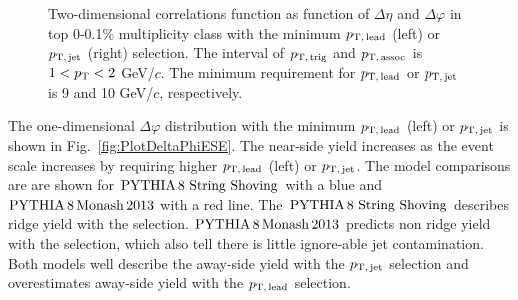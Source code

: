 \begin{figure}[h!]
	\centering
	\caption{ Two-dimensional correlations function as function of $\Delta\eta$ and $\Delta\varphi$ in top 0-0.1\% multiplicity class with the minimum $p_\mathrm{T,\,lead}$ (left) or $p_\mathrm{T,\,jet}$ (right) selection. The interval of $p_\mathrm{T,\,trig}$ and $p_\mathrm{T,\,assoc}$ is $1<p_\mathrm{T}<2$ GeV/$c$. The minimum requirement for $p_\mathrm{T,\,lead}$ or $p_\mathrm{T,\,jet}$ is 9 and 10 GeV/$c$, respectively. }
	\label{fig:PlotCorrHMTSel}
\end{figure}

The one-dimensional $\Delta\varphi$ distribution with the minimum $p_\mathrm{T,\,lead}$ (left) or $p_\mathrm{T,\,jet}$ is shown in Fig.~\ref{fig:PlotDeltaPhiESE}. The near-side yield increases as the event scale increases by requiring higher $p_\mathrm{T,\,lead}$ (left) or $p_\mathrm{T,\,jet}$. The model comparisons are are shown for $\mathrm{PYTHIA}\,8~\mathrm{String}~\mathrm{Shoving}$ with a blue and $\mathrm{PYTHIA}\,8\,\mathrm{Monash}\,2013$ with a red line. The $\mathrm{PYTHIA}\,8~\mathrm{String}~\mathrm{Shoving}$ describes ridge yield with the selection. $\mathrm{PYTHIA}\,8\,\mathrm{Monash}\,2013$ predicts non ridge yield with the selection, which also tell there is little ignore-able jet contamination. Both models well describe the away-side yield with the $p_\mathrm{T,\,jet}$ selection and overestimates away-side yield with the $p_\mathrm{T,\,lead}$ selection.

